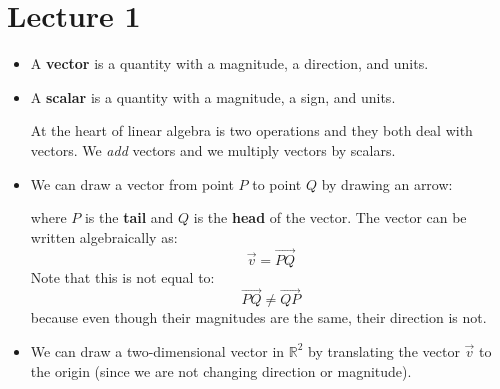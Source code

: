 \section{Lecture 1}
\begin{itemize}
    \item A \textbf{vector} is a quantity with a magnitude, a direction, and units.
    \item A \textbf{scalar} is a quantity with a magnitude, a sign, and units.
    \begin{idea}
        At the heart of linear algebra is two operations and they both deal with vectors. We \emph{add} vectors and we multiply vectors by scalars.
    \end{idea}
    \item We can draw a vector from point $P$ to point $Q$ by drawing an arrow:
    \begin{center}
    \end{center}
    where $P$ is the \textbf{tail} and $Q$ is the \textbf{head} of the vector. The vector can be written algebraically as:
    \begin{equation}
        \vec{v}=\vec{PQ}
        \label{eq:}
    \end{equation}
    Note that this is not equal to:
    \begin{equation}
        \vec{PQ} \neq \overrightarrow{QP}
        \label{eq:}
    \end{equation}
    because even though their magnitudes are the same, their direction is not.
    \item We can draw a two-dimensional vector in $\mathbb{R}^2$ by translating the vector $\vec{v}$ to the origin (since we are not changing direction or magnitude).
    \begin{center}
\end{center}
\end{itemize}
